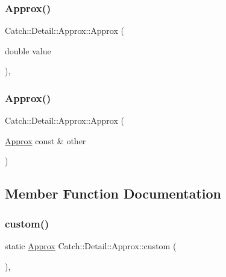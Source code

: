 \subsubsection{\texorpdfstring{Approx()}{Approx()}\hspace{0.1cm}{\footnotesize\ttfamily [1/2]}}
{\footnotesize\ttfamily Catch\+::\+Detail\+::\+Approx\+::\+Approx (\begin{DoxyParamCaption}\item[{double}]{value }\end{DoxyParamCaption})\hspace{0.3cm}{\ttfamily [inline]}, {\ttfamily [explicit]}}

\mbox{\label{class_catch_1_1_detail_1_1_approx_a807330c63266fc914abdf6e461255a54}} 
\subsubsection{\texorpdfstring{Approx()}{Approx()}\hspace{0.1cm}{\footnotesize\ttfamily [2/2]}}
{\footnotesize\ttfamily Catch\+::\+Detail\+::\+Approx\+::\+Approx (\begin{DoxyParamCaption}\item[{\mbox{\hyperlink{class_catch_1_1_detail_1_1_approx}{Approx}} const \&}]{other }\end{DoxyParamCaption})\hspace{0.3cm}{\ttfamily [inline]}}



\subsection{Member Function Documentation}
\mbox{\label{class_catch_1_1_detail_1_1_approx_aaf86dc0ee92272ac2d9839197a07951d}} 
\subsubsection{\texorpdfstring{custom()}{custom()}}
{\footnotesize\ttfamily static \mbox{\hyperlink{class_catch_1_1_detail_1_1_approx}{Approx}} Catch\+::\+Detail\+::\+Approx\+::custom (\begin{DoxyParamCaption}{ }\end{DoxyParamCaption})\hspace{0.3cm}{\ttfamily [inline]}, {\ttfamily [static]}}

